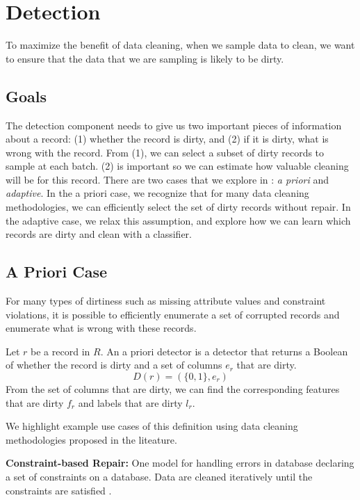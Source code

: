 \section{Detection}\label{det}
To maximize the benefit of data cleaning, when we sample data to clean, we want to ensure that the data that we are sampling is likely to be dirty.

\subsection{Goals}
The detection component needs to give us two important pieces of information about a record: (1) whether the record is dirty, and (2) if it is dirty, what is wrong with the record.
From (1), we can select a subset of dirty records to sample at each batch. 
(2) is important so we can estimate how valuable cleaning will be for this record.
There are two cases that we explore in \sys: \emph{a priori} and \emph{adaptive}.
In the a priori case, we recognize that for many data cleaning methodologies, we can efficiently select the set of dirty records without repair.
In the adaptive case, we relax this assumption, and explore how we can learn which records are dirty and clean with a classifier.

\subsection{A Priori Case}
For many types of dirtiness such as missing attribute values and constraint violations, it is possible to efficiently enumerate a set of corrupted records and enumerate what is wrong with these records.

\begin{definition}
Let $r$ be a record in $R$. An a priori detector is a detector that returns a Boolean of whether the record is dirty and a set of columns $e_r$ that are dirty.
\[
D(r) = (\{0,1\}, e_r)
\]
From the set of columns that are dirty, we can find the corresponding features that are dirty $f_r$ and labels that are dirty $l_r$.
\end{definition}

\noindent We highlight example use cases of this definition using data cleaning methodologies proposed in the liteature.

\vspace{0.5em}

\noindent\textbf{Constraint-based Repair: }
One model for handling errors in database declaring a set of constraints on a database.
Data are cleaned iteratively until the constraints are satisfied \cite{DBLP:journals/pvldb/YakoutENOI11, DBLP:journals/pvldb/FanLMTY10, khayyat2015bigdansing}.

